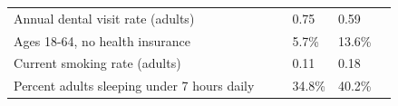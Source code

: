 \documentclass[9pt]{report}
\begin{document}
\begin{tabular}{p{.10in}p{.10in}p{.10in}p{3.7in}>{\hfill}p{.85in}>{\hfill}p{.85in}>{\hfill}p{.85in}>{\hfill}p{.85in}p{0.1in}}
\multicolumn{4}{l}{\parbox{3.6in}{\strut\raggedright{{Annual dental visit rate (adults)}}\strut}} &  &  & 0.75 & 0.59 & \multicolumn{1}{l}{}  \\ 
\multicolumn{4}{l}{\parbox{3.6in}{\strut\raggedright{{Ages 18-64, no health insurance}}\strut}} &  &  & 5.7\% & 13.6\% & \multicolumn{1}{l}{}  \\ 
\multicolumn{4}{l}{\parbox{3.6in}{\strut\raggedright{{Current smoking rate (adults)}}\strut}} &  &  & 0.11 & 0.18 & \multicolumn{1}{l}{}  \\ 
\multicolumn{4}{l}{\parbox{3.6in}{\strut\raggedright{{Percent adults sleeping under 7 hours daily}}\strut}} &  &  & 34.8\% & 40.2\% & \multicolumn{1}{l}{}  \\ 

\end{tabular}
\setlength{\tabcolsep}{6pt} %


\vspace{36pt}
\linespread{1.5}
\theendnotes
\end{document}
